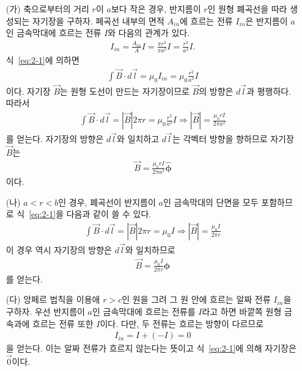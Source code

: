 \documentclass[tightenlines,floatfix,nofootinbib,superscriptaddress,fleqn]{revtex4}
\begin{document}
\begin{itemize}
  \item[(가)]
  축으로부터의 거리 $r$이 $a$보다 작은 경우, 반지름이 $r$인 원형 폐곡선을 따라
  생성되는 자기장을 구하자. 페곡선 내부의 면적 $A_{in}$에 흐르는 전류 $I_{in}$은
  반지름이 $a$인 금속막대에 흐르는 전류 $I$와 다음의 관계가 있다.
  \begin{align}
    I_{in} = \frac{A_{in}}{A}I = \frac{\pi r^2}{\pi a^2}I
    = \frac{r^2}{a^2}I.
  \end{align}
  식~\eqref{eq:2-1}에 의하면
  \begin{align}
    \int \vec{B}\cdot d \vec{l}=\mu_0 I_{in}=\mu_0 \frac{r^2}{a^2}I
  \end{align}
  이다. 자기장 $\vec{B}$는 원형 도선이 만드는 자기장이므로 
  $\vec{B}$의 방향은 $d\vec{l}$과 평행하다. 따라서
  \begin{align}
    \int \vec{B}\cdot d \vec{l} = \left|\vec{B} \right|2\pi r
    =\mu_0\frac{r^2}{a^2}I \Longrightarrow
    \left|\vec{B} \right| = \frac{\mu_0 r I}{2\pi a^2}
  \end{align}
  를 얻는다. 자기장의 방향은 $d\vec{l}$와 일치하고 $d\vec{l}$는 각벡터 방향을
  향하므로 자기장 $\vec{B}$는
  \begin{align}\label{eq:2-1-1}
    \vec{B} = \frac{\mu_0 r I}{2\pi a^2}\hat{\bm \phi}
  \end{align}
  이다.
  \item[(나)]
  $a<r<b$인 경우,  폐곡선이 반지름이 $a$인 금속막대의 단면을 모두 포함하므로
  식~\eqref{eq:2-1}을 다음과 같이 쓸 수 있다.
  \begin{align}
    \int \vec{B}\cdot d \vec{l}=\left|\vec{B} \right|2\pi r=\mu_0 I
    \Longrightarrow 
    \left|\vec{B} \right|=\frac{\mu_0 I}{2\pi r}
  \end{align}
  이 경우 역시 자기장의 방향은 $d\vec{l}$와 일치하므로
  \begin{align}\label{eq:2-2}
    \vec{B} = \frac{\mu_0 I}{2\pi r}\hat{\bm \phi}
  \end{align}
  를 얻는다.
  \item[(다)]
  앙페르 법칙을 이용애 $r>c$인 원을 그려 그 원 안에 흐르는 알짜 전류 $I_{in}$을 구하자.
  우선 반지름이 $a$인 금속막대에 흐르는 전류를 $I$라고 하면 바깥쪽 원형 금속과에 흐르는
  전류 또한 $I$이다. 다만, 두 전류는 흐르는 방향이 다르므로
  \begin{align}
    I_{in} = I + (-I) = 0
  \end{align}
  을 얻는다. 이는 알짜 전류가 흐르지 않는다는 뜻이고 식~\eqref{eq:2-1}에 의해
  자기장은 $\vec{0}$이다.

\end{itemize}
\end{document}
